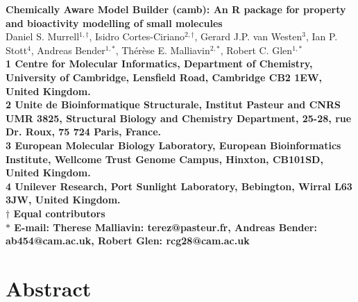 \documentclass[twoside,a4wide,10pt]{article}
\date{}
\begin{document}
\begin{flushleft}
{\Large
\textbf{Chemically Aware Model Builder (camb): An R package for property and bioactivity modelling of small molecules}
}
\\

Daniel S. Murrell$^{1,\dag}$,
Isidro Cortes-Ciriano$^{2,\dag}$,
Gerard J.P. van Westen$^{3}$,
Ian P. Stott$^{4}$,
Andreas Bender$^{1,\ast}$,
Th\'er\`ese E. Malliavin$^{2,\ast}$,
Robert C. Glen$^{1,\ast}$\\

\bf{1} Centre for Molecular Informatics, Department of Chemistry, University of Cambridge, Lensfield Road, Cambridge CB2 1EW, United Kingdom.
\\
\bf{2} Unite de Bioinformatique Structurale, Institut Pasteur and CNRS UMR 3825, Structural Biology and Chemistry Department, 25-28, rue Dr. Roux, 75 724 Paris, France.
\\
\bf{3} European Molecular Biology Laboratory, European Bioinformatics Institute, Wellcome Trust Genome Campus, Hinxton, CB101SD, United Kingdom.
\\
\bf{4} Unilever Research, Port Sunlight Laboratory, Bebington, Wirral L63 3JW, United Kingdom.
\\
$\dag$ Equal contributors\\
$\ast$ E-mail: Therese Malliavin: terez@pasteur.fr, Andreas Bender: ab454@cam.ac.uk, Robert Glen: rcg28@cam.ac.uk

\end{flushleft}

\section*{Abstract}
\end{document}

